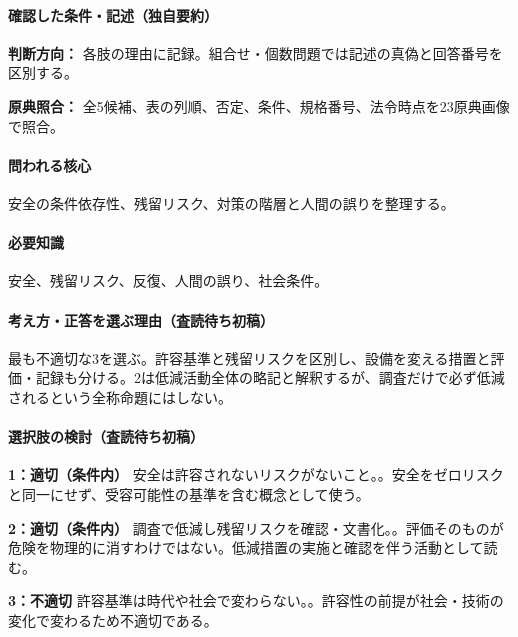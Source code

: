 \paragraph{確認した条件・記述（独自要約）}\mbox{}\par

\noindent\textbf{判断方向：} 各肢の理由に記録。組合せ・個数問題では記述の真偽と回答番号を区別する。\par

\noindent\textbf{原典照合：} 全5候補、表の列順、否定、条件、規格番号、法令時点を23原典画像で照合。\par

\paragraph{問われる核心} 安全の条件依存性、残留リスク、対策の階層と人間の誤りを整理する。

\paragraph{必要知識} 安全、残留リスク、反復、人間の誤り、社会条件。

\paragraph{考え方・正答を選ぶ理由（査読待ち初稿）} 最も不適切な3を選ぶ。許容基準と残留リスクを区別し、設備を変える措置と評価・記録も分ける。2は低減活動全体の略記と解釈するが、調査だけで必ず低減されるという全称命題にはしない。

\paragraph{選択肢の検討（査読待ち初稿）}\mbox{}\par

\noindent\textbf{1：適切（条件内）} 安全は許容されないリスクがないこと。。安全をゼロリスクと同一にせず、受容可能性の基準を含む概念として使う。\par

\noindent\textbf{2：適切（条件内）} 調査で低減し残留リスクを確認・文書化。。評価そのものが危険を物理的に消すわけではない。低減措置の実施と確認を伴う活動として読む。\par

\noindent\textbf{3：不適切} 許容基準は時代や社会で変わらない。。許容性の前提が社会・技術の変化で変わるため不適切である。\par

